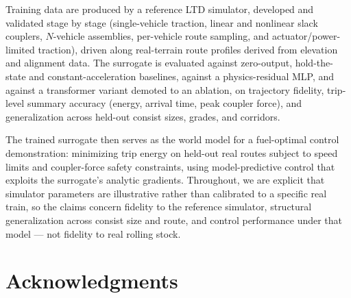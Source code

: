 \documentclass[12pt]{book}
\begin{document}
Training data are produced by a reference LTD simulator, developed and validated stage by stage (single-vehicle traction, linear and nonlinear slack couplers, $N$-vehicle assemblies, per-vehicle route sampling, and actuator/power-limited traction), driven along real-terrain route profiles derived from elevation and alignment data. The surrogate is evaluated against zero-output, hold-the-state and constant-acceleration baselines, against a physics-residual MLP, and against a transformer variant demoted to an ablation, on trajectory fidelity, trip-level summary accuracy (energy, arrival time, peak coupler force), and generalization across held-out consist sizes, grades, and corridors.

The trained surrogate then serves as the world model for a fuel-optimal control demonstration: minimizing trip energy on held-out real routes subject to speed limits and coupler-force safety constraints, using model-predictive control that exploits the surrogate's analytic gradients. Throughout, we are explicit that simulator parameters are illustrative rather than calibrated to a specific real train, so the claims concern fidelity to the reference simulator, structural generalization across consist size and route, and control performance under that model --- not fidelity to real rolling stock.

%

\chapter*{Acknowledgments}


\tableofcontents
\end{document}
